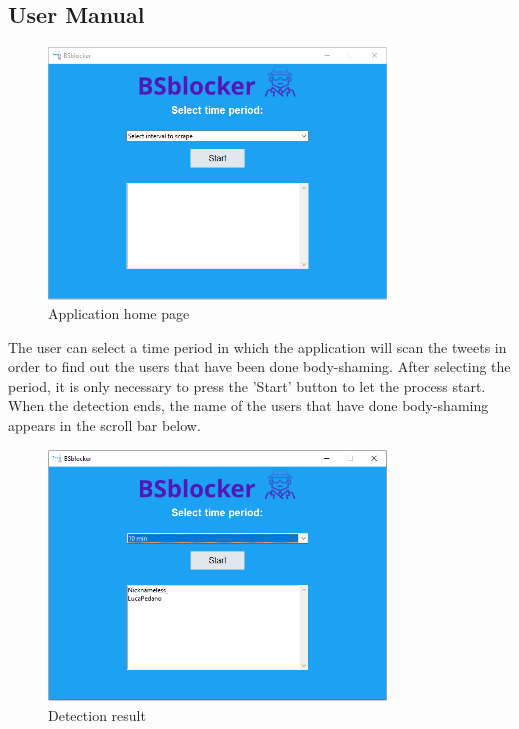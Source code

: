 \subsection{User Manual}
\begin{figure}[H]
    \centering
    \includegraphics[width= 0.8\textwidth]{images/application/homepage.png}
    \caption{Application home page} 
    \label{application-home}
\end{figure}
\noindent
The user can select a time period in which the application will scan the tweets in order to find out the users that have been done body-shaming. After selecting the period, it is only necessary to press the 'Start' button to let the process start. 
When the detection ends, the name of the users that have done body-shaming appears in the scroll bar below. 

\begin{figure}[H]
    \centering
    \includegraphics[width= 0.8\textwidth]{images/application/scrape.png}
    \caption{Detection result} 
    \label{use-cases}
\end{figure}


